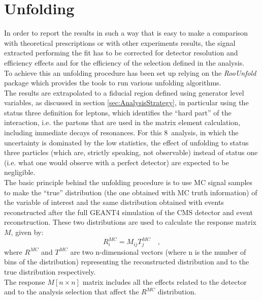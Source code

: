 \section{Unfolding}
\label{sec:Unfolding}
In order to report the results in such a way that is easy to make a comparison with theoretical prescriptions or with other experiments results, the signal extracted performing the fit has to be corrected for detector resolution and efficiency effects and for the efficiency of the selection defined in the analysis.\\
To achieve this an unfolding procedure has been set up relying on the \textit{RooUnfold}~\cite{Adye:2011gm} package which provides the tools to run various unfolding algorithms.\\
The results are extrapolated to a fiducial region defined using generator level variables, as discussed in section \ref{sec:AnalysisStrategy}, in particular using  the status three definition for leptons, which identifies the ``hard part'' of the interaction, i.e. the partons that are used in the matrix element calculation, including immediate decays of resonances.
For this 8~\TeV analysis, in which the uncertainty is dominated by the low statistics, the effect of unfolding to status three particles (which are, strictly speaking, not observable) instead of status one (i.e. what one would observe with a perfect detector) are expected to be negligible.\\
The basic principle behind the unfolding procedure is to use MC signal samples to make the ``true'' distribution (the one obtained with MC truth information) of the variable of interest and the same distribution obtained with events reconstructed after the full GEANT4 simulation of the CMS detector and event reconstruction. These two distributions are used to calculate the response matrix $M$, given by:
\begin{equation}
R_i^{MC} = M_{ij}T_j^{MC} \quad ,
\end{equation}
where $R^{MC}$ and $T^{MC}$ are two n-dimensional vectors (where n is the number of bins of the distribution) representing the reconstructed distribution and to the true distribution respectively.\\
The response $M [n \times n]$ matrix includes all the effects related to the detector and to the analysis selection that affect the $R^{MC}$ distribution.\\
